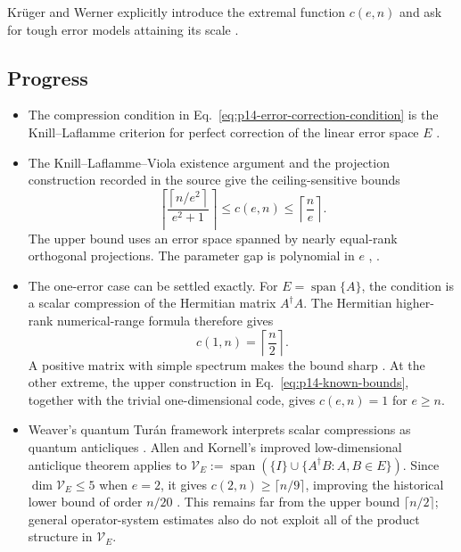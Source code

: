 Kr\"uger and Werner explicitly introduce the extremal function $c(e,n)$ and
ask for tough error models attaining its scale
.

\subsection*{Progress}

\begin{itemize}
  \item The compression condition in
  Eq.~\eqref{eq:p14-error-correction-condition} is the Knill--Laflamme
  criterion for perfect correction of the linear error space $E$
  .

  \item The Knill--Laflamme--Viola existence argument and the projection
  construction recorded in the source give the ceiling-sensitive bounds
  \begin{equation}
    \left\lceil
      \frac{\left\lceil n/e^2\right\rceil}{e^2+1}
    \right\rceil
    \le c(e,n)
    \le\left\lceil\frac{n}{e}\right\rceil.
    \label{eq:p14-known-bounds}
  \end{equation}
  The upper bound uses an error space spanned by nearly equal-rank orthogonal
  projections.  The parameter gap is polynomial in $e$
  ,
  .

  \item The one-error case can be settled exactly.  For
  $E=\operatorname{span}\{A\}$, the condition is a scalar compression of the
  Hermitian matrix $A^\dagger A$.  The Hermitian higher-rank numerical-range
  formula therefore gives
  \begin{equation}
    c(1,n)=\left\lceil\frac{n}{2}\right\rceil.
    \label{eq:p14-one-error-exact}
  \end{equation}
  A positive matrix with simple spectrum makes the bound sharp
  .  At the other extreme, the upper
  construction in Eq.~\eqref{eq:p14-known-bounds}, together with the trivial
  one-dimensional code, gives $c(e,n)=1$ for $e\ge n$.

  \item Weaver's quantum Turán framework interprets scalar compressions as
  quantum anticliques
  .  Allen and Kornell's improved
  low-dimensional anticlique theorem applies to
  $\mathcal{V}_E:=\operatorname{span}(\{I\}\cup
  \{A^\dagger B:A,B\in E\})$.
  Since $\dim\mathcal{V}_E\le5$ when $e=2$, it gives
  $c(2,n)\ge\lceil n/9\rceil$, improving the historical lower bound of
  order $n/20$
  .  This remains far from the upper
  bound $\lceil n/2\rceil$; general operator-system estimates also do not
  exploit all of the product structure in $\mathcal{V}_E$.
\end{itemize}

